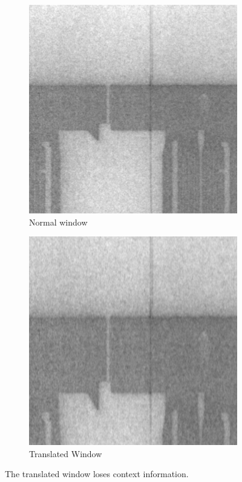 \begin{figure}[!h]
\centering
\begin{subfigure}{.5\textwidth}
  \centering
  \includegraphics[width=.4\linewidth]{images/implementation/augmentations/window_no_translation}
  \caption{Normal window}
\end{subfigure}%
\begin{subfigure}{.5\textwidth}
  \centering
  \includegraphics[width=.4\linewidth]{images/implementation/augmentations/window_stretch}
  \caption{Translated Window}
\end{subfigure}
\caption{The translated window loses context information.}
\label{sfdfsfsdfhf3}
\end{figure}

